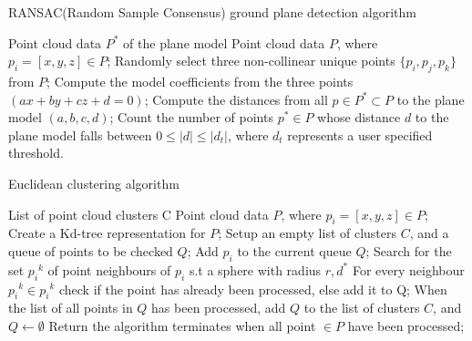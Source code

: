 \documentclass[a4paper, 12pt]{article}
\begin{document}
\begin{sloppypar}
\begin{algorithm}[h]
    \caption{RANSAC(Random Sample Consensus) ground plane detection algorithm  }
    \label{Chap3:Alg1}
    \begin{algorithmic}[1]
        \Ensure Point cloud data $P^*$ of the plane model
        \Require Point cloud data $P$, where $p_i=[x,y,z] \in P$;
        \State Randomly select three non-collinear unique points $\{p_i, p_j, p_k\}$ from $P$;
        \State Compute the model coefficients from the three points $(ax + by + cz + d = 0)$;
        \State Compute the distances from all $p \in P^* \subset P$ to the plane model $(a,b,c,d)$;
        \State Count the number of points $p^* \in P$ whose distance $d$ to the plane model falls between $0 \leq |d| \leq |d_t|$, where $d_t$ represents a user specified threshold.
    \end{algorithmic}
\end{algorithm}


\begin{algorithm}[h]
    \caption{Euclidean clustering algorithm  \cite{rusu_thesis,cnn_uav}}
    \label{Chap3:Alg2}
    \begin{algorithmic}[1]
        \Ensure List of point cloud clusters C
        \Require Point cloud data $P$, where $p_i=[x,y,z] \in P$;
        \State Create a Kd-tree representation for $P$;
        \State Setup an empty list of clusters $C$, and a queue of points to be checked $Q$;
        \State Add $p_i$ to the current queue $Q$;
        \State Search for the set ${p_i}^k$ of point neighbours of $p_i$ s.t a sphere with radius $r,d^*$
        \State For every neighbour ${p_i}^k \in {p_i}^k$ check if the point has already been processed, else add it to Q;
        \EndFor
        \State When the list of all points in $Q$ has been processed, add $Q$ to the list of clusters $C$, and $Q \gets \emptyset$
        \EndFor
        \State Return the algorithm terminates when all point $\in P$ have been processed;
    \end{algorithmic}
\end{algorithm}





\end{sloppypar}
\end{document}

